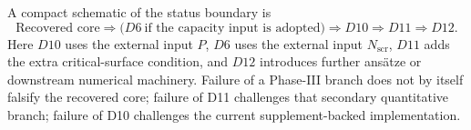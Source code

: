 A compact schematic of the status boundary is
\[
\text{Recovered core}
\Longrightarrow
\bigl(D6\ \text{if the capacity input is adopted}\bigr)
\Longrightarrow
D10
\Longrightarrow
D11
\Longrightarrow
D12.
\]
Here \(D10\) uses the external input \(P\), \(D6\) uses the external input \(N_{\mathrm{scr}}\), \(D11\) adds the extra critical-surface condition, and \(D12\) introduces further ans\"atze or downstream numerical machinery. Failure of a Phase-III branch does not by itself falsify the recovered core; failure of D11 challenges that secondary quantitative branch; failure of D10 challenges the current supplement-backed implementation.
